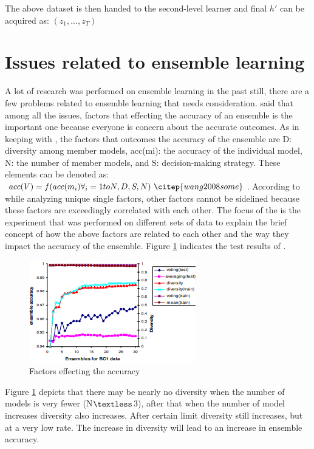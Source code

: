 \documentclass[12pt]{article}
\begin{document}
The above dataset is then handed to the second-level learner and final $h'$ can be acquired as: $( z_1 , . . . , z_T )$


\section{Issues related to ensemble learning}
A lot of research was performed on ensemble learning in the past still, there are a few problems related to ensemble learning that needs consideration. \citep{wang2008some} said that among all the issues, factors that effecting the accuracy of an ensemble is the important one because everyone is concern about the accurate outcomes. As in keeping with \citep{wang2008some}, the factors that outcomes the accuracy of the ensemble are D: diversity among member models, acc(mi): the accuracy of the individual model, N: the number of member models, and S: decision-making strategy. These elements can be denoted as:
$acc(V) = f ( acc(m_i) \forall_i = 1toN,D,S,N) ~\citep{wang2008some}$.
According to \citep{wang2008some} while analyzing unique single factors, other factors cannot be sidelined because these factors are exceedingly correlated with each other. The focus of the \citep{wang2008some} is the experiment that was performed on different sets of data to explain the brief concept of how the above factors are related to each other and the way they impact the accuracy of the ensemble. Figure \ref{fig:issues} indicates the test results of \citep{wang2008some}. 
 \begin{figure}[h!]
 	\centering
	\includegraphics{issues.png}
	\caption{Factors effecting the accuracy ~\citep{wang2008some}}
	\label{fig:issues}
\end{figure}
Figure \ref{fig:issues} depicts that there may be nearly no diversity when the number of models is very fewer (N$\textless$3), after that when the number of model increases diversity also increases. After certain limit diversity still increases, but at a very low rate. The increase in diversity will lead to an increase in ensemble accuracy.
\end{document}
